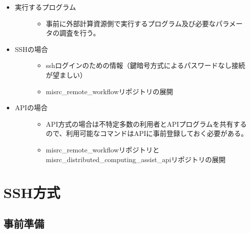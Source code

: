 \documentclass[letterpaper,10pt,dvipdfmx,openany]{sphinxmanual}
\begin{document}
\begin{itemize}
\item {} \begin{description}
\item[{実行するプログラム}] \leavevmode\begin{itemize}
\item {} 
事前に外部計算資源側で実行するプログラム及び必要なパラメータの調査を行う。

\end{itemize}

\end{description}

\item {} \begin{description}
\item[{SSHの場合}] \leavevmode\begin{itemize}
\item {} 
sshログインのための情報（鍵暗号方式によるパスワードなし接続が望ましい）

\item {} 
misrc\_remote\_workflowリポジトリの展開

\end{itemize}

\end{description}

\item {} \begin{description}
\item[{APIの場合}] \leavevmode\begin{itemize}
\item {} 
API方式の場合は不特定多数の利用者とAPIプログラムを共有するので、利用可能なコマンドはAPIに事前登録しておく必要がある。

\item {} 
misrc\_remote\_workflowリポジトリとmisrc\_distributed\_computing\_assist\_apiリポジトリの展開

\end{itemize}

\end{description}

\end{itemize}


\section{SSH方式}
\label{\detokenize{using_distributed_properties:id26}}

\subsection{事前準備}
\label{\detokenize{using_distributed_properties:id27}}
\end{document}
